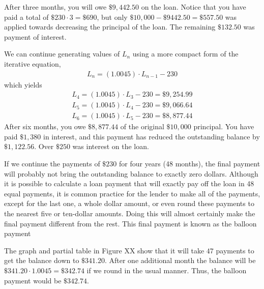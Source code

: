 \documentclass[10pt,]{book}
\theoremstyle{plain}
\theoremstyle{definition}
\theoremstyle{definition}
\theoremstyle{definition}
\numberwithin{equation}{section}
\begin{document}
\hypertarget{p-35}{}%
After three months, you will owe \(\$9,442.50\) on the loan. Notice that you have paid a total of \(\$230\cdot 3=\$690\), but only \(\$10,000-\$9442.50=\$557.50\) was applied towards decreasing the principal of the loan. The remaining \(\$132.50\) was payment of interest.%
\par
\hypertarget{p-36}{}%
We can continue generating values of \(L_n\) using a more compact form of the iterative equation,%
%
\begin{gather*}
L_n=(1.0045)\cdot L_{n-1}-230
\end{gather*}
\hypertarget{p-37}{}%
which yields%
%
\begin{gather*}
L_4=(1.0045)\cdot L_3-230=\$9,254.99\\
L_5=(1.0045)\cdot L_4-230=\$9,066.64\\
L_6=(1.0045)\cdot L_5-230=\$8,877.44
\end{gather*}
\hypertarget{p-38}{}%
After six months, you owe \(\$8,877.44\) of the original \(\$10,000\) principal.  You have paid \(\$1,380\) in interest, and this payment has reduced the outstanding balance by \(\$1,122.56\).  Over \(\$250\) was interest on the loan.%
\par
\hypertarget{p-39}{}%
If we continue the payments of \(\$230\) for four years (48 months), the final payment will probably not bring the outstanding balance to exactly zero dollars.  Although it is possible to calculate a loan payment that will exactly pay off the loan in 48 equal payments, it is common practice for the lender to make all of the payments, except for the last one, a whole dollar amount, or even round these payments to the nearest five or ten-dollar amounts. Doing this will almost certainly make the final payment different from the rest.  This final payment is known as the balloon payment%
\par
\hypertarget{p-40}{}%
The graph and partial table in Figure XX show that it will take \(47\) payments to get the balance down to \(\$341.20\).  After one additional month the balance will be \(\$341.20\cdot 1.0045=\$342.74\) if we round in the usual manner.  Thus, the balloon payment would be \(\$342.74\).%
\end{document}
